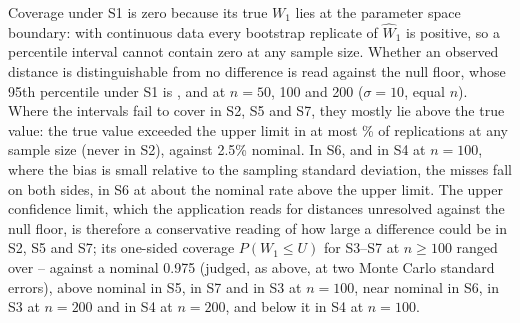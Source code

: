 \documentclass[AMA,Times1COL]{WileyNJDv5}
\begin{document}
Coverage under S1 is zero because its true $W_1$ lies at the parameter space boundary: with continuous data every bootstrap replicate of $\widehat{W}_1$ is positive, so a percentile interval cannot contain zero at any sample size. Whether an observed distance is distinguishable from no difference is read against the null floor, whose 95th percentile under S1 is ,  and  at $n = 50$, 100 and 200 ($\sigma = 10$, equal $n$). Where the intervals fail to cover in S2, S5 and S7, they mostly lie above the true value: the true value exceeded the upper limit in at most \% of replications at any sample size (never in S2), against 2.5\% nominal. In S6, and in S4 at $n = 100$, where the bias is small relative to the sampling standard deviation, the misses fall on both sides, in S6 at about the nominal rate above the upper limit. The upper confidence limit, which the application reads for distances unresolved against the null floor, is therefore a conservative reading of how large a difference could be in S2, S5 and S7; its one-sided coverage $P(W_1 \leq U)$ for S3--S7 at $n \geq 100$ ranged over -- against a nominal 0.975 (judged, as above, at two Monte Carlo standard errors), above nominal in S5, in S7 and in S3 at $n = 100$, near nominal in S6, in S3 at $n = 200$ and in S4 at $n = 200$, and below it in S4 at $n = 100$.
\end{document}
